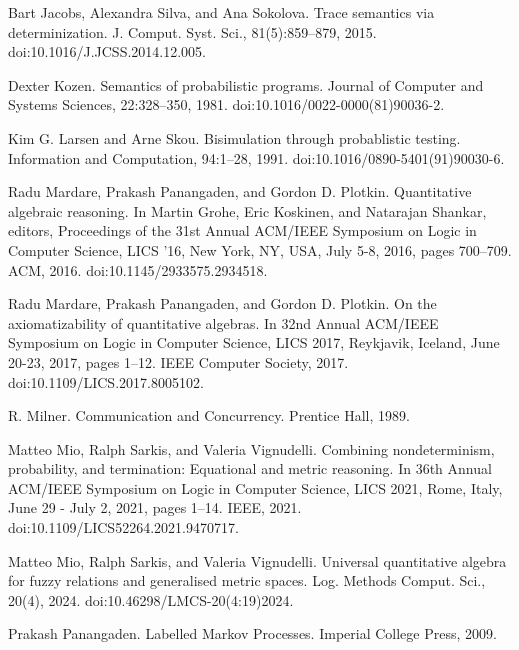 \documentclass[10pt,a4paper]{article}
\begin{document}
\par\noindent  [36]  Bart Jacobs, Alexandra Silva, and Ana Sokolova.  Trace semantics via determinization.  J. Comput. Syst. Sci., 81(5):859–879, 2015.  doi:10.1016/J.JCSS.2014.12.005.  
 
\par\noindent  [37]  Dexter Kozen.  Semantics of probabilistic programs.  Journal of Computer and Systems Sciences, 22:328–350, 1981.  doi:10.1016/0022-0000(81)90036-2.  
 
\par\noindent  [38]  Kim G. Larsen and Arne Skou.  Bisimulation through probablistic testing.  Information and Computation, 94:1–28, 1991.  doi:10.1016/0890-5401(91)90030-6.  
 
\par\noindent  [39]  Radu Mardare, Prakash Panangaden, and Gordon D. Plotkin.  Quantitative algebraic reasoning.  In Martin Grohe, Eric Koskinen, and Natarajan Shankar, editors, Proceedings of the 31st Annual ACM/IEEE Symposium on Logic in Computer Science, LICS ’16, New York, NY, USA, July 5-8, 2016, pages 700–709. ACM, 2016.  doi:10.1145/2933575.2934518.  
 
\par\noindent  [40]  Radu Mardare, Prakash Panangaden, and Gordon D. Plotkin.  On the axiomatizability of quantitative algebras.  In 32nd Annual ACM/IEEE Symposium on Logic in Computer Science, LICS 2017, Reykjavik, Iceland, June 20-23, 2017, pages 1–12. IEEE Computer Society, 2017.  doi:10.1109/LICS.2017.8005102.  
 
\par\noindent  [41]  R. Milner.  Communication and Concurrency.  Prentice Hall, 1989.  
 
\par\noindent  [42]  Matteo Mio, Ralph Sarkis, and Valeria Vignudelli.  Combining nondeterminism, probability, and termination: Equational and metric reasoning.  In 36th Annual ACM/IEEE Symposium on Logic in Computer Science, LICS 2021, Rome, Italy, June 29 - July 2, 2021, pages 1–14. IEEE, 2021.  doi:10.1109/LICS52264.2021.9470717.  
 
\par\noindent  [43]  Matteo Mio, Ralph Sarkis, and Valeria Vignudelli.  Universal quantitative algebra for fuzzy relations and generalised metric spaces.  Log. Methods Comput. Sci., 20(4), 2024.  doi:10.46298/LMCS-20(4:19)2024.  
 
\par\noindent  [44]  Prakash Panangaden.  Labelled Markov Processes.  Imperial College Press, 2009.  
 
\end{document}
